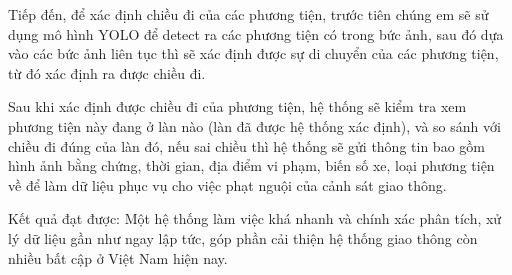 \documentclass[14pt,oneside,a4paper]{extreport}
\begin{document}
Tiếp đến, để xác định chiều đi của các phương tiện, trước tiên chúng em sẽ sử dụng mô hình YOLO để detect ra các phương tiện có trong bức ảnh, sau đó dựa vào các bức ảnh liên tục thì sẽ xác định được sự di chuyển của các phương tiện, từ đó xác định ra được chiều đi.

Sau khi xác định được chiều đi của phương tiện, hệ thống sẽ kiểm tra xem phương tiện này đang ở làn nào (làn đã được hệ thống xác định), và so sánh với chiều đi đúng của làn đó, nếu sai chiều thì hệ thống sẽ gửi thông tin bao gồm hình ảnh bằng chứng, thời gian, địa điểm vi phạm, biến số xe, loại phương tiện về để làm dữ liệu phục vụ cho việc phạt nguội của cảnh sát giao thông.

Kết quả đạt được: Một hệ thống làm việc khá nhanh và chính xác phân tích, xử lý dữ liệu gần như ngay lập tức, góp phần cải thiện hệ thống giao thông còn nhiều bất cập ở Việt Nam hiện nay.
\end{document}
